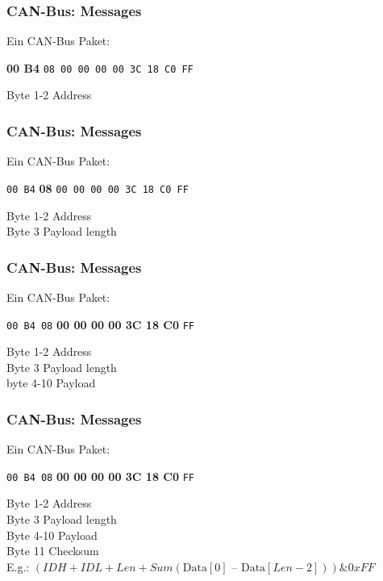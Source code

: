 \documentclass[t]{beamer}
\begin{document}
\begin{frame}
	\frametitle{CAN-Bus: Messages}
    Ein CAN-Bus Paket:
    \newline
    \newline
    \newline
    \newline
    {\Large \centerline{\textbf{00 B4} \texttt{08 00 00 00 00 3C 18 C0 FF}}}
    \vspace*{1cm}

    Byte 1-2 Address
\end{frame}

\begin{frame}
	\frametitle{CAN-Bus: Messages}
    Ein CAN-Bus Paket:
    \newline
    \newline
    \newline
    \newline
    {\Large \centerline{\texttt{00 B4} \textbf{08} \texttt{00 00 00 00 3C 18 C0 FF}}}
    \vspace*{1cm}

    Byte 1-2 Address \\
    Byte 3 Payload length
\end{frame}

\begin{frame}
	\frametitle{CAN-Bus: Messages}
    Ein CAN-Bus Paket:
    \newline
    \newline
    \newline
    \newline
{\Large \centerline{\texttt{00 B4 08} \textbf{00 00 00 00 3C 18 C0} \texttt{FF}}}
    \vspace*{1cm}

    Byte 1-2 Address \\
    Byte 3 Payload length \\
    byte 4-10 Payload
\end{frame}

\begin{frame}
	\frametitle{CAN-Bus: Messages}
    Ein CAN-Bus Paket:
    \newline
    \newline
    \newline
    \newline
{\Large \centerline{\texttt{00 B4 08} \textbf{00 00 00 00 3C 18 C0} \texttt{FF}}}
    \vspace*{1cm}

    Byte 1-2 Address \\
    Byte 3 Payload length \\
    Byte 4-10 Payload \\
    Byte 11 Checksum \\
    E.g.: $(IDH + IDL + Len + Sum(\text{Data}[0]\text{ – }\text{Data}[Len-2])) \& 0xFF $
\end{frame}
\end{document}
